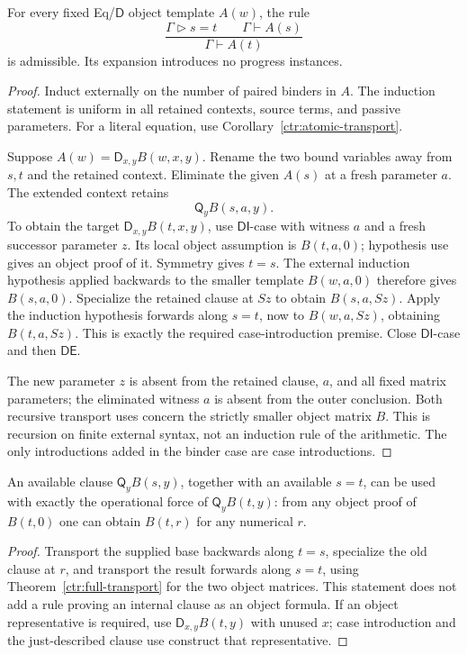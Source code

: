 \begin{theorem}
\label{ctr:full-transport}\label{thm:atomic-transport}
For every fixed Eq/$\mathsf D$ object template $A(w)$, the rule
\[
 \frac{\Gamma\mathrel{\triangleright}s=t\qquad
       \Gamma\vdash A(s)}
      {\Gamma\vdash A(t)}
 \tag{Object transport}
\]
is admissible. Its expansion introduces no progress instances.
\end{theorem}
\begin{proof}
Induct externally on the number of paired binders in $A$. The induction
statement is uniform in all retained contexts, source terms, and passive
parameters. For a literal equation, use
Corollary~\ref{ctr:atomic-transport}.

Suppose $A(w)=\mathsf D_{x,y}B(w,x,y)$. Rename the two bound
variables away from $s,t$ and the retained context. Eliminate the given
$A(s)$ at a fresh parameter $a$. The extended context retains
\[
                     \mathsf Q_y B(s,a,y).
\]
To obtain the target $\mathsf D_{x,y}B(t,x,y)$, use
$\mathsf{DI}$-case with witness $a$ and a fresh successor parameter
$z$. Its local object assumption is $B(t,a,0)$; hypothesis use gives
an object proof of it. Symmetry gives $t=s$. The external induction
hypothesis applied backwards to the smaller template $B(w,a,0)$
therefore gives $B(s,a,0)$. Specialize the retained clause at $Sz$ to
obtain $B(s,a,Sz)$. Apply the induction hypothesis forwards along
$s=t$, now to $B(w,a,Sz)$, obtaining $B(t,a,Sz)$. This is exactly
the required case-introduction premise. Close $\mathsf{DI}$-case and
then $\mathsf{DE}$.

The new parameter $z$ is absent from the retained clause, $a$, and all
fixed matrix parameters; the eliminated witness $a$ is absent from the
outer conclusion. Both recursive transport uses concern the strictly
smaller object matrix $B$. This is recursion on finite external syntax,
not an induction rule of the arithmetic. The only introductions added
in the binder case are case introductions.
\end{proof}

\begin{proposition}
\label{ctr:clause-transport}
An available clause $\mathsf Q_yB(s,y)$, together with an available
$s=t$, can be used with exactly the operational force of
$\mathsf Q_yB(t,y)$: from any object proof of $B(t,0)$ one can
obtain $B(t,r)$ for any numerical $r$.
\end{proposition}
\begin{proof}
Transport the supplied base backwards along $t=s$, specialize the old
clause at $r$, and transport the result forwards along $s=t$, using
Theorem~\ref{ctr:full-transport} for the two object matrices.
This statement does not add a rule proving an internal clause as an
object formula. If an object representative is required, use
$\mathsf D_{x,y}B(t,y)$ with unused $x$; case introduction and the
just-described clause use construct that representative.
\end{proof}

